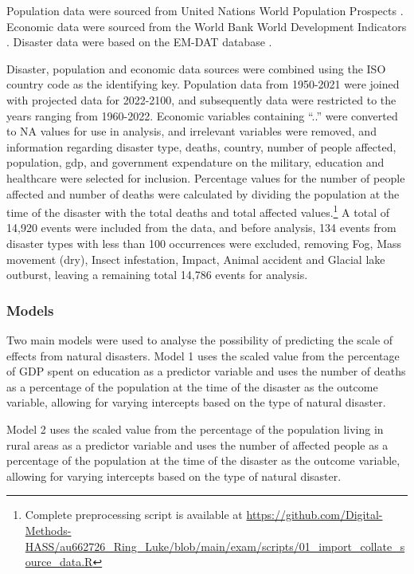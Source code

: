 \documentclass[10pt,a4paper,onecolumn]{article}
\begin{document}
Population data were sourced from United Nations World Population Prospects \autocite{unitednationsWorldPopulationProspects2022}. Economic data were sourced from the World Bank World Development Indicators \autocite{worldbankWorldDevelopmentIndicators2022}. Disaster data were based on the EM-DAT database \autocite{cred/uclouvainEMDATInternationalDisaster2023}.

Disaster, population and economic data sources were combined using the ISO country code as the identifying key. Population data from 1950-2021 were joined with projected data for 2022-2100, and subsequently data were restricted to the years ranging from 1960-2022. Economic variables containing ``..'' were converted to NA values for use in analysis, and irrelevant variables were removed, and information regarding disaster type, deaths, country, number of people affected, population, gdp, and government expendature on the military, education and healthcare were selected for inclusion. Percentage values for the number of people affected and number of deaths were calculated by dividing the population at the time of the disaster with the total deaths and total affected values.\footnote{Complete preprocessing script is available at \url{https://github.com/Digital-Methods-HASS/au662726_Ring_Luke/blob/main/exam/scripts/01_import_collate_source_data.R}} A total of 14,920 events were included from the data, and before analysis, 134 events from disaster types with less than 100 occurrences were excluded, removing Fog, Mass movement (dry), Insect infestation, Impact, Animal accident and Glacial lake outburst, leaving a remaining total 14,786 events for analysis.

\hypertarget{models}{%
\subsubsection{Models}\label{models}}

Two main models were used to analyse the possibility of predicting the scale of effects from natural disasters. Model 1 uses the scaled value from the percentage of GDP spent on education as a predictor variable and uses the number of deaths as a percentage of the population at the time of the disaster as the outcome variable, allowing for varying intercepts based on the type of natural disaster.

Model 2 uses the scaled value from the percentage of the population living in rural areas as a predictor variable and uses the number of affected people as a percentage of the population at the time of the disaster as the outcome variable, allowing for varying intercepts based on the type of natural disaster.
\end{document}
